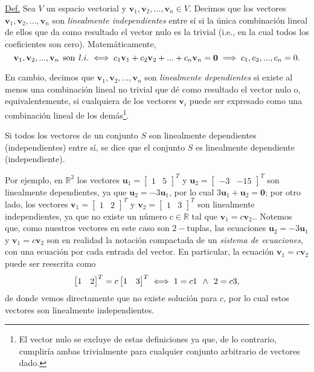 \documentclass[12pt]{article}
\begin{document}
\begin{tcolorbox}

    \underline{Def.} Sea $V$ un espacio vectorial y $\mathbf{v}_1,\mathbf{v}_2,...,\mathbf{v}_n\in V$. Decimos que los vectores $\mathbf{v}_1,\mathbf{v}_2, ...,\mathbf{v}_n$ son \emph{linealmente independientes} entre sí si la única combinación lineal de ellos que da como resultado el vector nulo es la trivial (i.e., en la cual todos los coeficientes son cero). Matemáticamente, $$\mathbf{v}_1,\mathbf{v}_2, ..., \mathbf{v}_n \hspace{1.5mm} \text{son} \hspace{1.5mm} l.i. \iff c_1\mathbf{v}_1+c_2\mathbf{v}_2+...+c_n\mathbf{v}_n=\mathbf{0}\implies c_1,c_2, ...,c_n=0.$$

    En cambio, decimos que $\mathbf{v}_1,\mathbf{v}_2, ..., \mathbf{v}_n$ son \emph{linealmente dependientes} si existe al menos una combinación lineal no trivial que dé como resultado el vector nulo o, equivalentemente, si cualquiera de los vectores $\mathbf{v}_i$ puede ser expresado como una combinación lineal de los demás\footnote{El vector nulo se excluye de estas definiciones ya que, de lo contrario, cumpliría ambas trivialmente para cualquier conjunto arbitrario de vectores dado.}.

    Si todos los vectores de un conjunto $S$ son linealmente dependientes (independientes) entre sí, se dice que el conjunto $S$ es linealmente dependiente (independiente).

\end{tcolorbox}

Por ejemplo, en $\mathbb{R}^2$ los vectores $\mathbf{u}_1=\begin{bmatrix} 1 & 5 \end{bmatrix}^T$ y $\mathbf{u}_2=\begin{bmatrix} -3 & -15 \end{bmatrix}^T$ son linealmente dependientes, ya que $\mathbf{u}_2=-3\mathbf{u}_1$, por lo cual $3\mathbf{u}_1+\mathbf{u}_2=\mathbf{0}$; por otro lado, los vectores $\mathbf{v}_1=\begin{bmatrix} 1 & 2 \end{bmatrix}^T$ y $\mathbf{v}_2=\begin{bmatrix} 1 & 3 \end{bmatrix}^T$ son linealmente independientes, ya que no existe un número $c\in\mathbb{R}$ tal que $\mathbf{v}_1=c\mathbf{v}_2.$. Notemos que, como nuestros vectores en este caso son $2-$tuplas, las ecuaciones $\mathbf{u}_2=-3\mathbf{u}_1$ y $\mathbf{v}_1=c\mathbf{v}_2$ son en realidad la notación compactada de un \emph{sistema de ecuaciones}, con una ecuación por cada entrada del vector. En particular, la ecuación $\mathbf{v}_1=c\mathbf{v}_2$ puede ser reescrita como $$\begin{bmatrix} 1 & 2 \end{bmatrix}^T=c\begin{bmatrix} 1 & 3 \end{bmatrix}^T\iff 1=c1 \hspace{1.5mm} \land\hspace{1.5mm} 2=c3,$$ de donde vemos directamente que no existe solución para $c$, por lo cual estos vectores son linealmente independientes.
\end{document}
